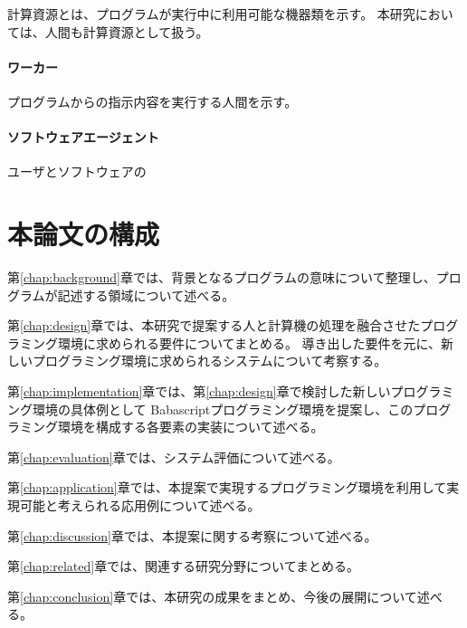 計算資源とは、プログラムが実行中に利用可能な機器類を示す。
本研究においては、人間も計算資源として扱う。

\paragraph{ワーカー}\label{ux30efux30fcux30abux30fc}

プログラムからの指示内容を実行する人間を示す。

\paragraph{ソフトウェアエージェント}\label{ux30bdux30d5ux30c8ux30a6ux30a7ux30a2ux30a8ux30fcux30b8ux30a7ux30f3ux30c8}

ユーザとソフトウェアの

\section{本論文の構成}\label{ux672cux8ad6ux6587ux306eux69cbux6210}

第\ref{chap:background}章では、背景となるプログラムの意味について整理し、プログラムが記述する領域について述べる。

第\ref{chap:design}章では、本研究で提案する人と計算機の処理を融合させたプログラミング環境に求められる要件についてまとめる。
導き出した要件を元に、新しいプログラミング環境に求められるシステムについて考察する。

第\ref{chap:implementation}章では、第\ref{chap:design}章で検討した新しいプログラミング環境の具体例として
Babascriptプログラミング環境を提案し、このプログラミング環境を構成する各要素の実装について述べる。

第\ref{chap:evaluation}章では、システム評価について述べる。

第\ref{chap:application}章では、本提案で実現するプログラミング環境を利用して実現可能と考えられる応用例について述べる。

第\ref{chap:discussion}章では、本提案に関する考察について述べる。

第\ref{chap:related}章では、関連する研究分野についてまとめる。

第\ref{chap:conclusion}章では、本研究の成果をまとめ、今後の展開について述べる。
